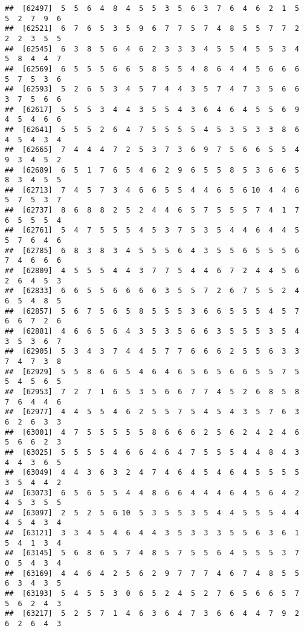 \documentclass[
]{book}
\begin{document}
\begin{verbatim}
##  [62497]  5  5  6  4  8  4  5  5  3  5  6  3  7  6  4  6  2  1  5  5  2  7  9  6
##  [62521]  6  7  6  5  3  5  9  6  7  7  5  7  4  8  5  5  7  7  2  2  2  3  5  5
##  [62545]  6  3  8  5  6  4  6  2  3  3  3  4  5  5  4  5  5  3  4  5  8  4  4  7
##  [62569]  6  5  5  5  6  6  5  8  5  5  4  8  6  4  4  5  6  6  6  5  7  5  3  6
##  [62593]  5  2  6  5  3  4  5  7  4  4  3  5  7  4  7  3  5  6  6  3  7  5  6  6
##  [62617]  5  5  5  3  4  4  3  5  5  4  3  6  4  6  4  5  5  6  9  4  5  4  6  6
##  [62641]  5  5  5  2  6  4  7  5  5  5  5  4  5  3  5  3  3  8  6  4  5  4  3  4
##  [62665]  7  4  4  4  7  2  5  3  7  3  6  9  7  5  6  6  5  5  4  9  3  4  5  2
##  [62689]  6  5  1  7  6  5  4  6  2  9  6  5  5  8  5  3  6  6  5  8  3  4  5  5
##  [62713]  7  4  5  7  3  4  6  6  5  5  4  4  6  5  6 10  4  4  6  5  7  5  3  7
##  [62737]  8  6  8  8  2  5  2  4  4  6  5  7  5  5  5  7  4  1  7  6  5  5  5  4
##  [62761]  5  4  7  5  5  5  4  5  3  7  5  3  5  4  4  6  4  4  5  5  7  6  4  6
##  [62785]  6  8  3  8  3  4  5  5  5  6  4  3  5  5  6  5  5  5  6  7  4  6  6  6
##  [62809]  4  5  5  5  4  4  3  7  7  5  4  4  6  7  2  4  4  5  6  2  6  4  5  3
##  [62833]  6  6  5  5  6  6  6  6  3  5  5  7  2  6  7  5  5  2  4  6  5  4  8  5
##  [62857]  5  6  7  5  6  5  8  5  5  5  3  6  6  5  5  5  4  5  7  6  6  7  2  6
##  [62881]  4  6  6  5  6  4  3  5  3  5  6  6  3  5  5  5  3  5  4  3  5  3  6  7
##  [62905]  5  3  4  3  7  4  4  5  7  7  6  6  6  2  5  5  6  3  3  7  4  7  3  8
##  [62929]  5  5  8  6  6  5  4  6  4  6  5  6  5  6  6  5  5  7  5  5  4  5  6  5
##  [62953]  7  2  7  1  6  5  3  5  6  6  7  7  4  5  2  6  8  5  8  7  6  4  4  6
##  [62977]  4  4  5  5  4  6  2  5  5  7  5  4  5  4  3  5  7  6  3  6  2  6  3  3
##  [63001]  4  7  5  5  5  5  5  8  6  6  6  2  5  6  2  4  2  4  6  5  6  6  2  3
##  [63025]  5  5  5  5  4  6  6  4  6  4  7  5  5  5  4  4  8  4  3  4  4  3  6  5
##  [63049]  4  4  3  6  3  2  4  7  4  6  4  5  4  6  4  5  5  5  5  3  5  4  4  2
##  [63073]  6  5  6  5  5  4  4  8  6  6  4  4  4  6  4  5  6  4  2  4  5  3  5  5
##  [63097]  2  5  2  5  6 10  5  3  5  5  3  5  4  4  5  5  5  4  4  4  5  4  3  4
##  [63121]  3  3  4  5  4  6  4  4  3  5  3  3  3  5  5  6  3  6  1  5  4  1  3  4
##  [63145]  5  6  8  6  5  7  4  8  5  7  5  5  6  4  5  5  5  3  7  0  5  4  3  4
##  [63169]  4  4  6  4  2  5  6  2  9  7  7  7  4  6  7  4  8  5  5  6  3  4  3  5
##  [63193]  5  4  5  5  3  0  6  5  2  4  5  2  7  6  5  6  6  5  7  5  6  2  4  3
##  [63217]  5  2  5  7  1  4  6  3  6  4  7  3  6  6  4  4  7  9  2  6  2  6  4  3

\end{verbatim}
\end{document}
